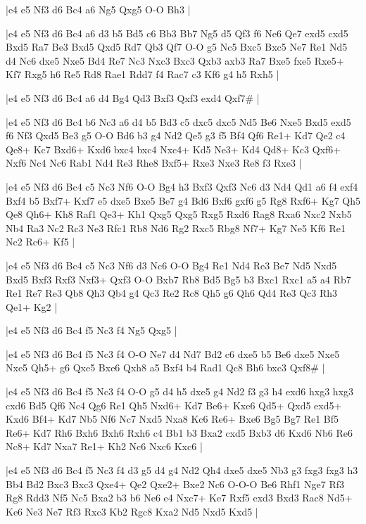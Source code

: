\whitename{}
\blackname{}
\makegametitle
|e4 e5 Nf3 d6 Bc4 a6 Ng5 Qxg5 O-O Bh3  |

\whitename{}
\blackname{}
\makegametitle
|e4 e5 Nf3 d6 Bc4 a6 d3 b5 Bd5 c6 Bb3 Bb7 Ng5 d5 Qf3 f6 Ne6 Qe7 exd5 cxd5 Bxd5 Ra7 Be3 Bxd5 Qxd5 Rd7 Qb3 Qf7 O-O g5 Nc5 Bxc5 Bxc5 Ne7 Re1 Nd5 d4 Nc6 dxe5 Nxe5 Bd4 Re7 Nc3 Nxc3 Bxc3 Qxb3 axb3 Ra7 Bxe5 fxe5 Rxe5+ Kf7 Rxg5 h6 Re5 Rd8 Rae1 Rdd7 f4 Rac7 c3 Kf6 g4 h5 Rxh5  |

\whitename{}
\blackname{}
\makegametitle
|e4 e5 Nf3 d6 Bc4 a6 d4 Bg4 Qd3 Bxf3 Qxf3 exd4 Qxf7\#  |

\whitename{}
\blackname{}
\makegametitle
|e4 e5 Nf3 d6 Bc4 b6 Nc3 a6 d4 b5 Bd3 c5 dxc5 dxc5 Nd5 Be6 Nxe5 Bxd5 exd5 f6 Nf3 Qxd5 Be3 g5 O-O Bd6 b3 g4 Nd2 Qe5 g3 f5 Bf4 Qf6 Re1+ Kd7 Qe2 c4 Qe8+ Kc7 Bxd6+ Kxd6 bxc4 bxc4 Nxc4+ Kd5 Ne3+ Kd4 Qd8+ Kc3 Qxf6+ Nxf6 Nc4 Nc6 Rab1 Nd4 Re3 Rhe8 Bxf5+ Rxe3 Nxe3 Re8 f3 Rxe3  |

\whitename{}
\blackname{}
\makegametitle
|e4 e5 Nf3 d6 Bc4 c5 Nc3 Nf6 O-O Bg4 h3 Bxf3 Qxf3 Nc6 d3 Nd4 Qd1 a6 f4 exf4 Bxf4 b5 Bxf7+ Kxf7 e5 dxe5 Bxe5 Be7 g4 Bd6 Bxf6 gxf6 g5 Rg8 Rxf6+ Kg7 Qh5 Qe8 Qh6+ Kh8 Raf1 Qe3+ Kh1 Qxg5 Qxg5 Rxg5 Rxd6 Rag8 Rxa6 Nxc2 Nxb5 Nb4 Ra3 Nc2 Rc3 Ne3 Rfc1 Rb8 Nd6 Rg2 Rxc5 Rbg8 Nf7+ Kg7 Ne5 Kf6 Re1 Nc2 Rc6+ Kf5  |

\whitename{}
\blackname{}
\makegametitle
|e4 e5 Nf3 d6 Bc4 c5 Nc3 Nf6 d3 Nc6 O-O Bg4 Re1 Nd4 Re3 Be7 Nd5 Nxd5 Bxd5 Bxf3 Rxf3 Nxf3+ Qxf3 O-O Bxb7 Rb8 Bd5 Bg5 b3 Bxc1 Rxc1 a5 a4 Rb7 Re1 Re7 Re3 Qb8 Qh3 Qb4 g4 Qc3 Re2 Rc8 Qh5 g6 Qh6 Qd4 Re3 Qc3 Rh3 Qe1+ Kg2  |

\whitename{}
\blackname{}
\makegametitle
|e4 e5 Nf3 d6 Bc4 f5 Nc3 f4 Ng5 Qxg5  |

\whitename{}
\blackname{}
\makegametitle
|e4 e5 Nf3 d6 Bc4 f5 Nc3 f4 O-O Ne7 d4 Nd7 Bd2 c6 dxe5 b5 Be6 dxe5 Nxe5 Nxe5 Qh5+ g6 Qxe5 Bxe6 Qxh8 a5 Bxf4 b4 Rad1 Qc8 Bh6 bxc3 Qxf8\#  |

\whitename{}
\blackname{}
\makegametitle
|e4 e5 Nf3 d6 Bc4 f5 Nc3 f4 O-O g5 d4 h5 dxe5 g4 Nd2 f3 g3 h4 exd6 hxg3 hxg3 cxd6 Bd5 Qf6 Nc4 Qg6 Re1 Qh5 Nxd6+ Kd7 Be6+ Kxe6 Qd5+ Qxd5 exd5+ Kxd6 Bf4+ Kd7 Nb5 Nf6 Nc7 Nxd5 Nxa8 Kc6 Re6+ Bxe6 Bg5 Bg7 Re1 Bf5 Re6+ Kd7 Rh6 Bxh6 Bxh6 Rxh6 c4 Bb1 b3 Bxa2 cxd5 Bxb3 d6 Kxd6 Nb6 Re6 Nc8+ Kd7 Nxa7 Re1+ Kh2 Nc6 Nxc6 Kxc6  |

\whitename{}
\blackname{}
\makegametitle
|e4 e5 Nf3 d6 Bc4 f5 Nc3 f4 d3 g5 d4 g4 Nd2 Qh4 dxe5 dxe5 Nb3 g3 fxg3 fxg3 h3 Bb4 Bd2 Bxc3 Bxc3 Qxe4+ Qe2 Qxe2+ Bxe2 Nc6 O-O-O Be6 Rhf1 Nge7 Rf3 Rg8 Rdd3 Nf5 Nc5 Bxa2 b3 b6 Ne6 e4 Nxc7+ Ke7 Rxf5 exd3 Bxd3 Rac8 Nd5+ Ke6 Ne3 Ne7 Rf3 Rxc3 Kb2 Rgc8 Kxa2 Nd5 Nxd5 Kxd5  |

